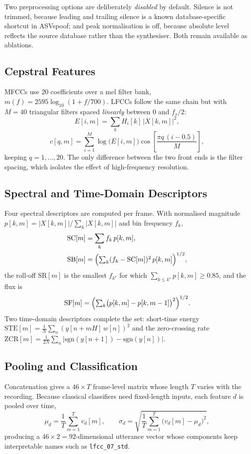 \documentclass[journal,10pt]{IEEEtran}
\begin{document}
Two preprocessing options are deliberately \emph{disabled} by default.
Silence is not trimmed, because leading and trailing silence is a known
database-specific shortcut in ASVspoof; and peak normalisation is off,
because absolute level reflects the source database rather than the
synthesiser. Both remain available as ablations.

\subsection{Cepstral Features}
MFCCs use $20$ coefficients over a mel filter bank,
$m(f) = 2595 \log_{10}(1 + f/700)$. LFCCs follow the same chain but with
$M = 40$ triangular filters spaced \emph{linearly} between $0$ and $f_s/2$:
\begin{equation}
E[i,m] = \sum_{k} H_i[k]\,\bigl|X[k,m]\bigr|^{2} ,
\end{equation}
\begin{equation}
c[q,m] = \sum_{i=1}^{M} \log\bigl(E[i,m]\bigr)
         \cos\!\left[\frac{\pi q\,(i-0.5)}{M}\right] ,
\end{equation}
keeping $q = 1,\dots,20$. The only difference between the two front ends is
the filter spacing, which isolates the effect of high-frequency resolution.

\subsection{Spectral and Time-Domain Descriptors}
Four spectral descriptors are computed per frame. With normalised magnitude
$p[k,m] = |X[k,m]| / \sum_k |X[k,m]|$ and bin frequency $f_k$,
\begin{align}
\mathrm{SC}[m] &= \sum_k f_k\,p[k,m] , \\
\mathrm{SB}[m] &= \Bigl(\textstyle\sum_k (f_k - \mathrm{SC}[m])^{2}\,p[k,m]\Bigr)^{1/2} ,
\end{align}
the roll-off $\mathrm{SR}[m]$ is the smallest $f_{k^\star}$ for which
$\sum_{k \le k^\star} p[k,m] \ge 0.85$, and the flux is
\begin{equation}
\mathrm{SF}[m] = \Bigl(\textstyle\sum_k \bigl(p[k,m] - p[k,m-1]\bigr)^{2}\Bigr)^{1/2} .
\end{equation}
Two time-domain descriptors complete the set: short-time energy
$\mathrm{STE}[m] = \frac{1}{N}\sum_n (y[n+mH]\,w[n])^{2}$ and the
zero-crossing rate
$\mathrm{ZCR}[m] = \frac{1}{2N}\sum_n \bigl|\mathrm{sgn}(y[n{+}1]) - \mathrm{sgn}(y[n])\bigr|$.

\subsection{Pooling and Classification}
Concatenation gives a $46 \times T$ frame-level matrix whose length $T$
varies with the recording. Because classical classifiers need fixed-length
inputs, each feature $d$ is pooled over time,
\begin{equation}
\mu_d = \frac{1}{T}\sum_{m=1}^{T} v_d[m], \qquad
\sigma_d = \sqrt{\frac{1}{T}\sum_{m=1}^{T}\bigl(v_d[m]-\mu_d\bigr)^{2}} ,
\end{equation}
producing a $46 \times 2 = 92$-dimensional utterance vector whose components
keep interpretable names such as \texttt{lfcc\_07\_std}.
\end{document}
